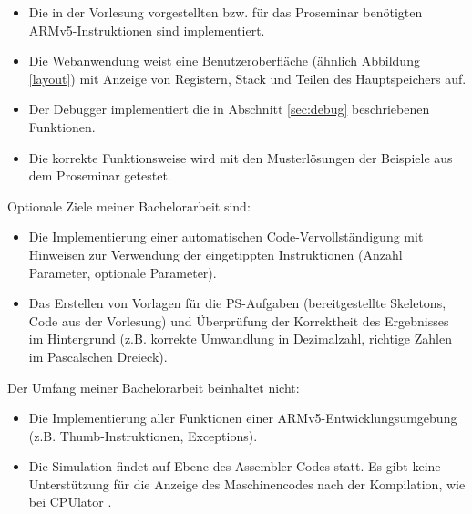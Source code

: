 \documentclass[a4paper, 11pt, onecolumn]{article}
\begin{document}
\begin{itemize}
\item Die in der Vorlesung vorgestellten bzw. für das Proseminar benötigten ARMv5-Instruktionen sind implementiert.
\item Die Webanwendung weist eine Benutzeroberfläche (ähnlich Abbildung \ref{layout}) mit Anzeige von Registern, Stack und Teilen des Hauptspeichers auf.
\item Der Debugger implementiert die in Abschnitt \ref{sec:debug} beschriebenen Funktionen.
\item Die korrekte Funktionsweise wird mit den Musterlösungen der Beispiele aus dem Proseminar getestet.
\end{itemize}
Optionale Ziele meiner Bachelorarbeit sind:

\begin{itemize}
\item Die Implementierung einer automatischen Code-Vervollständigung mit Hinweisen zur Verwendung der eingetippten Instruktionen (Anzahl Parameter, optionale Parameter).
\item Das Erstellen von Vorlagen für die PS-Aufgaben (bereitgestellte Skeletons, Code aus der Vorlesung) und Überprüfung der Korrektheit des Ergebnisses im Hintergrund (z.B. korrekte Umwandlung in Dezimalzahl, richtige Zahlen im Pascalschen Dreieck).
\end{itemize}
Der Umfang meiner Bachelorarbeit beinhaltet nicht:

\begin{itemize}
\item Die Implementierung aller Funktionen einer ARMv5-Entwicklungsumgebung (z.B. Thumb-Instruktionen, Exceptions).
\item Die Simulation findet auf Ebene des Assembler-Codes statt. Es gibt keine Unterstützung für die Anzeige des Maschinencodes nach der Kompilation, wie bei CPUlator \cite{cpulator}.
\end{itemize}




\end{document}
